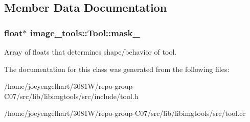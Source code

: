 \subsection{Member Data Documentation}
\subsubsection[{\texorpdfstring{mask\+\_\+}{mask_}}]{\setlength{\rightskip}{0pt plus 5cm}float$\ast$ image\+\_\+tools\+::\+Tool\+::mask\+\_\+\hspace{0.3cm}{\ttfamily [private]}}\hypertarget{classimage__tools_1_1Tool_a71fa87e91a5cbe0336246c8007b53e6c}{}\label{classimage__tools_1_1Tool_a71fa87e91a5cbe0336246c8007b53e6c}
Array of floats that determines shape/behavior of tool. 

The documentation for this class was generated from the following files\+:\begin{DoxyCompactItemize}
\item 
/home/joeyengelhart/3081\+W/repo-\/group-\/\+C07/src/lib/libimgtools/src/include/tool.\+h\item 
/home/joeyengelhart/3081\+W/repo-\/group-\/\+C07/src/lib/libimgtools/src/tool.\+cc\end{DoxyCompactItemize}
